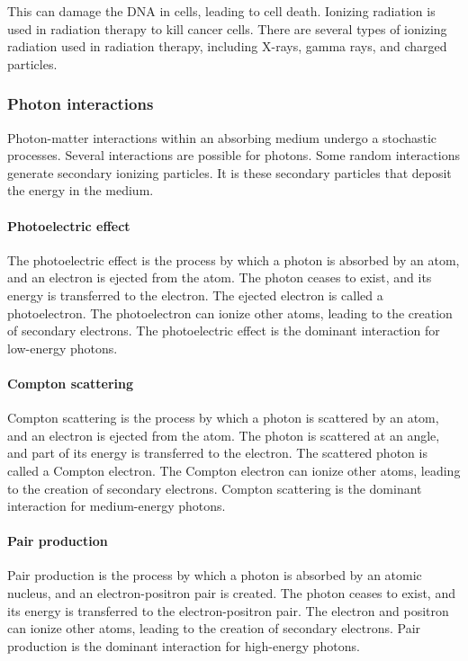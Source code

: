 This can damage the DNA in cells, leading to cell death.
Ionizing radiation is used in radiation therapy to kill cancer cells.
There are several types of ionizing radiation used in radiation therapy, including X-rays, gamma rays, and charged particles.

\subsubsection{Photon interactions}
Photon-matter interactions within an absorbing medium undergo a stochastic processes.
Several interactions are possible for photons.
Some random interactions generate secondary ionizing particles.
It is these secondary particles that deposit the energy in the medium.

\paragraph{Photoelectric effect}
The photoelectric effect is the process by which a photon is absorbed by an atom, and an electron is ejected from the atom.
The photon ceases to exist, and its energy is transferred to the electron.
The ejected electron is called a photoelectron.
The photoelectron can ionize other atoms, leading to the creation of secondary electrons.
The photoelectric effect is the dominant interaction for low-energy photons.

\paragraph{Compton scattering}
Compton scattering is the process by which a photon is scattered by an atom, and an electron is ejected from the atom.
The photon is scattered at an angle, and part of its energy is transferred to the electron.
The scattered photon is called a Compton electron.
The Compton electron can ionize other atoms, leading to the creation of secondary electrons.
Compton scattering is the dominant interaction for medium-energy photons.

\paragraph{Pair production}
Pair production is the process by which a photon is absorbed by an atomic nucleus, and an electron-positron pair is created.
The photon ceases to exist, and its energy is transferred to the electron-positron pair.
The electron and positron can ionize other atoms, leading to the creation of secondary electrons.
Pair production is the dominant interaction for high-energy photons.

